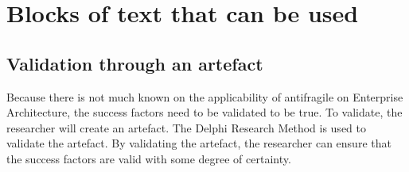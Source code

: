 \chapter{Blocks of text that can be used}

\section{Validation through an artefact}
Because there is not much known on the applicability of antifragile on Enterprise Architecture, the success factors need to be validated to be true. To validate, the researcher will create an artefact. The Delphi Research Method is used to validate the artefact. By validating the artefact, the researcher can ensure that the success factors are valid with some degree of certainty.\\
